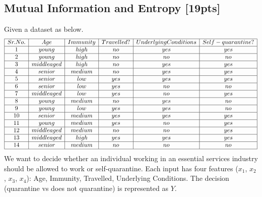 \documentclass{article}
\begin{document}
\subsection{Mutual Information and Entropy [19pts]}
Given a dataset as below.
$$\begin{array}{|c|c|c|c|c|c|}\hline Sr.No. & Age & Immunity & Travelled? & Underlying Conditions & Self-quarantine? \\ \hline 1 & young & high & no & yes & yes \\ \hline 2 & young & high & no & no & no \\ \hline 3 & middle aged & high & no & yes & yes \\ \hline 4 & senior & medium & no & yes & yes \\ \hline 5 & senior & low & yes & yes & yes \\ \hline 6 & senior & low & yes & no & no \\ \hline 7 & middle aged & low & yes & no & yes\\ \hline 8 & young & medium & no & yes & no\\ \hline 9 & young & low & yes & yes & no\\ \hline 10 & senior & medium & yes & yes & yes\\ \hline 11 & young & medium & yes & no & yes \\ \hline 12 & middle aged & medium & no & no & yes \\ \hline 13 & middle aged & high & yes & yes & yes \\ \hline 14 & senior & medium & no & no & no \\\hline\end{array}$$
We want to decide whether an individual working in an essential services industry should be allowed to work or self-quarantine. Each input has four features ($x_1$, $x_2$, $x_3$, $x_4$): Age, Immunity, Travelled, Underlying Conditions. The decision (quarantine vs does not quarantine) is represented as $Y$.
\end{document}
